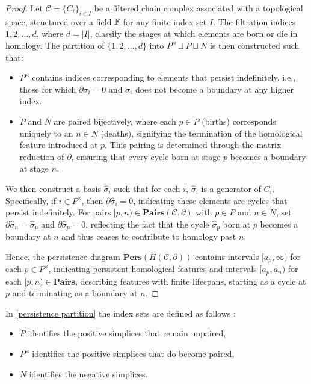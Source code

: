 \begin{proof}
	Let $\mathcal{C}= \{C_{i}\}_{i \in I}$ be a filtered chain complex associated with
	a topological space, structured over a field ${\mathbb{F}}$ for any finite index
	set $I$. The filtration indices ${1, 2, \ldots, d}$, where $d = \vert I \vert$,
	classify the stages at which elements are born or die in homology. The
	partition of $\{1, 2, \ldots, d\}$ into $P^{\Join} \sqcup P \sqcup N$ is then
	constructed such that:
	\begin{itemize}
		\item $P^{\Join}$ contains indices corresponding to elements that persist indefinitely,
			i.e., those for which $\partial\sigma_{i} = 0$ and $\sigma_{i}$ does not
			become a boundary at any higher index.

		\item $P$ and $N$ are paired bijectively, where each $p \in P$ (births)
			corresponds uniquely to an $n \in N$ (deaths), signifying the termination of
			the homological feature introduced at $p$. This pairing is determined
			through the matrix reduction of $\partial$, ensuring that every cycle born
			at stage $p$ becomes a boundary at stage $n$.
	\end{itemize}

	We then construct a basis ${\hat{\sigma}_i}$ such that for each $i$, $\hat{\sigma}
	_{i}$ is a generator of $C_{i}$. Specifically, if $i \in P^{\Join}$, then
	$\partial\hat{\sigma}_{i} = 0$, indicating these elements are cycles that persist
	indefinitely. For pairs $[p, n) \in \textbf{Pairs}(\mathcal{C}, \partial)$
	with $p \in P$ and $n \in N$, set $\partial\hat{\sigma}_{n} = \hat{\sigma}_{p}$
	and $\partial\hat{\sigma}_{p} = 0$, reflecting the fact that the cycle
	$\hat{\sigma}_{p}$ born at $p$ becomes a boundary at $n$ and thus ceases to
	contribute to homology past $n$.

	Hence, the persistence diagram $\textbf{Pers}(H(\mathcal{C}, \partial))$ contains
	intervals $[a_{p}, \infty)$ for each $p \in P^{\Join}$, indicating persistent
	homological features and intervals $[a_{p}, a_{n})$ for each
	$[p, n) \in \textbf{Pairs}$, describing features with finite lifespans,
	starting as a cycle at $p$ and terminating as a boundary at $n$.
\end{proof}

In \ref{persistence partition} the index sets are defined as follows \cite[p.8]{de2011dualities}:
\begin{itemize}
	\item $P$ identifies the positive simplices that remain unpaired,

	\item $P^{\Join}$ identifies the positive simplices that do become paired,

	\item $N$ identifies the negative simplices.
\end{itemize}

